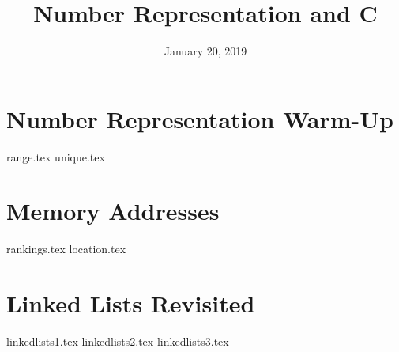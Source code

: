 \documentclass[11pt]{exam}
\title{Number Representation and C}
\date{January 20, 2019}
\begin{document}
\maketitle

\section{Number Representation Warm-Up}
\begin{questions}
{range.tex}
{unique.tex}
\end{questions}
\newpage

\section{Memory Addresses}
\begin{questions}
{rankings.tex}
{location.tex}
\end{questions}

\section{Linked Lists Revisited}
\begin{questions}
{linkedlists1.tex}
{linkedlists2.tex}
{linkedlists3.tex}
\end{questions}
\end{document}
